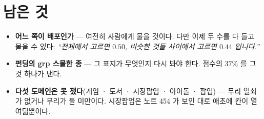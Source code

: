 \documentclass[11pt]{article}
\begin{document}
\section*{남은 것}

\begin{itemize}
\item \textbf{어느 쪽이 배포인가} --- 여전히 사람에게 물을 것이다. 다만
이제 두 수를 다 들고 물을 수 있다: \emph{``전체에서 고르면 $0.50$,
비슷한 것들 사이에서 고르면 $0.44$ 입니다.''}
\item \textbf{펀딩의 grp 스물한 종} --- 그 표지가 무엇인지 다시 봐야
한다. 점수의 $37\%$ 를 그것 하나가 낸다.
\item \textbf{다섯 도메인은 못 쟀다}(게임 · 도서 · 시장팝업 · 아이돌 ·
팝업) --- 무리 열쇠가 없거나 무리가 둘 미만이다. 시장팝업은 노트 454 가
보인 대로 애초에 칸이 열여덟뿐이다.
\end{itemize}
\end{document}

